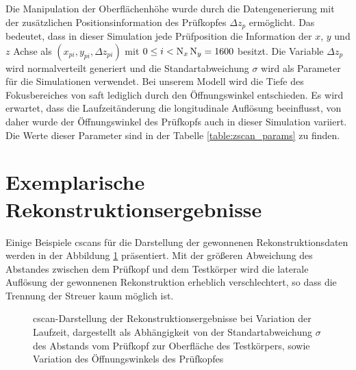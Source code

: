 Die Manipulation der Oberflächenhöhe wurde durch die Datengenerierung mit der zusätzlichen Positionsinformation des Prüfkopfes $\Delta z_p$ ermöglicht. Das bedeutet, dass in dieser Simulation jede Prüfposition die Information der $x$, $y$ und $z$ Achse als $(x_{pi}, y_{pi}, \Delta z_{pi})$ mit $0 \leq i < \operatorname{N}_x \operatorname{N}_y = 1600$ besitzt. Die Variable $\Delta z_p$ wird normalverteilt generiert und die Standartabweichung $\sigma$ wird als Parameter für die Simulationen verwendet. Bei unserem Modell wird die Tiefe des Fokusbereiches von \acrshort{saft} lediglich durch den Öffnungswinkel entschieden. Es wird erwartet, dass die Laufzeitänderung die longitudinale Auflösung beeinflusst, von daher wurde der Öffnungswinkel des Prüfkopfs auch in dieser Simulation variiert. Die Werte dieser Parameter sind in der Tabelle \ref{table:zscan_params} zu finden. \par




\section{Exemplarische Rekonstruktionsergebnisse} \label{sec:zscan_recos}
Einige Beispiele \glspl{cscan} für die Darstellung der gewonnenen Rekonstruktionsdaten werden in der Abbildung \ref{fig:zscan_cimgs} präsentiert. Mit der größeren Abweichung des Abstandes zwischen dem Prüfkopf und dem Testkörper wird die laterale Auflösung der gewonnenen Rekonstruktion erheblich verschlechtert, so dass die Trennung der Streuer kaum möglich ist.\par
\begin{figure}[h!]
\centering

\caption[C-Scan-Darstellung mit Laufzeitänderungen]{
\gls{cscan}-Darstellung der Rekonstruktionsergebnisse bei Variation der Laufzeit, dargestellt als Abhängigkeit von der Standartabweichung $\sigma$ des Abstands vom Prüfkopf zur Oberfläche des Testkörpers, sowie Variation des Öffnungswinkels des Prüfkopfes}
\label{fig:zscan_cimgs}
\end{figure}
\clearpage


